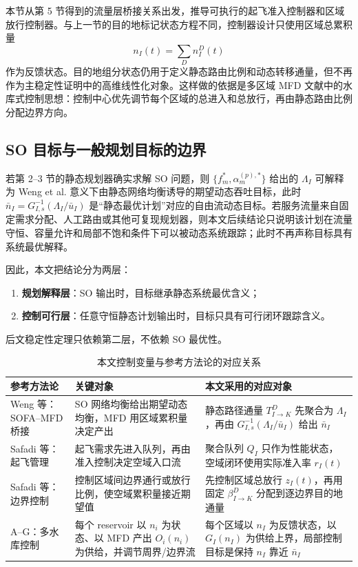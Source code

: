 \documentclass[a4paper,12pt]{article}
\theoremstyle{plain}
\theoremstyle{definition}
\theoremstyle{remark}
\begin{document}
本节从第 5 节得到的流量层桥接关系出发，推导可执行的起飞准入控制器和区域放行控制器。与上一节的目的地标记状态方程不同，控制器设计只使用区域总累积量
\[
    n_I(t)=\sum_D n_I^D(t)
\]
作为反馈状态。目的地组分状态仍用于定义静态路由比例和动态转移通量，但不再作为主稳定性证明中的高维线性化对象。这样做的依据是多区域 MFD 文献中的水库式控制思想：控制中心优先调节每个区域的总进入和总放行，再由静态路由比例分配边界方向。

\subsection{SO 目标与一般规划目标的边界}

若第 2--3 节的静态规划器确实求解 SO 问题，则 $\{f_m^*,\alpha_m^{(p),*}\}$ 给出的 $\Lambda_I$ 可解释为 Weng et al. 意义下由静态网络均衡诱导的期望动态吞吐目标，此时 $\bar n_I=G_{I,s}^{-1}(\Lambda_I/\bar u_I)$ 是“静态最优计划”对应的自由流动态目标。若服务流量来自固定需求分配、人工路由或其他可复现规划器，则本文后续结论只说明该计划在流量守恒、容量允许和局部不饱和条件下可以被动态系统跟踪；此时不再声称目标具有系统最优解释。

因此，本文把结论分为两层：
\begin{enumerate}
    \item \textbf{规划解释层}：SO 输出时，目标继承静态系统最优含义；
    \item \textbf{控制可行层}：任意守恒静态计划输出时，目标只具有可行闭环跟踪含义。
\end{enumerate}
后文稳定性定理只依赖第二层，不依赖 SO 最优性。

\begin{table}[htbp]
\centering
\caption{本文控制变量与参考方法论的对应关系}
\label{tab:method_mapping}
\begin{tabular}{p{4.0cm}p{4.8cm}p{4.8cm}}
\toprule
参考方法论 & 关键对象 & 本文采用的对应对象\\
\midrule
Weng 等：SOFA--MFD 桥接
& SO 网络均衡给出期望动态均衡，MFD 用区域累积量决定产出
& 静态路径通量 $T_{I\to K}^D$ 先聚合为 $\Lambda_I$，再由 $G_{I,s}^{-1}(\Lambda_I/\bar u_I)$ 给出 $\bar n_I$\\
Safadi 等：起飞管理
& 起飞需求先进入队列，再由准入控制决定空域入口流
& 聚合队列 $Q_I$ 只作为性能状态，空域闭环使用实际准入率 $r_I(t)$\\
Safadi 等：边界控制
& 控制区域间边界通行或放行比例，使空域累积量接近期望值
& 先控制区域总放行 $z_I(t)$，再用固定 $\beta_{I\to K}^D$ 分配到逐边界目的地通量\\
A--G：多水库控制
& 每个 reservoir 以 $n_i$ 为状态、以 MFD 产出 $O_i(n_i)$ 为供给，并调节周界/边界流
& 每个区域以 $n_I$ 为反馈状态，以 $G_I(n_I)$ 为供给上界，局部控制目标是保持 $n_I$ 靠近 $\bar n_I$\\
\bottomrule
\end{tabular}
\end{table}
\end{document}
